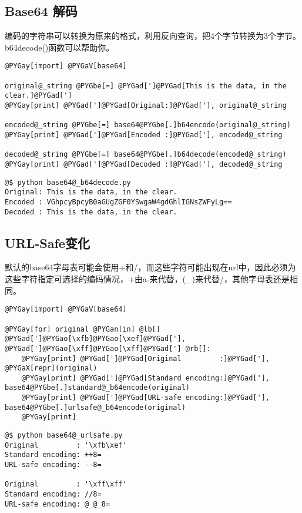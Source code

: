 \documentclass[a4paper,10pt,english]{manual}
\begin{document}
\subsection{Base64 解码}

编码的字符串可以转换为原来的格式，利用反向查询，把4个字节转换为3个字节。b64decode()函数可以帮助你。

\begin{Verbatim}[commandchars=@\[\]]
@PYGay[import] @PYGaV[base64]

original@_string @PYGbe[=] @PYGad[']@PYGad[This is the data, in the clear.]@PYGad[']
@PYGay[print] @PYGad[']@PYGad[Original:]@PYGad['], original@_string

encoded@_string @PYGbe[=] base64@PYGbe[.]b64encode(original@_string)
@PYGay[print] @PYGad[']@PYGad[Encoded :]@PYGad['], encoded@_string

decoded@_string @PYGbe[=] base64@PYGbe[.]b64decode(encoded@_string)
@PYGay[print] @PYGad[']@PYGad[Decoded :]@PYGad['], decoded@_string
\end{Verbatim}

\begin{Verbatim}[commandchars=@\[\]]
@$ python base64@_b64decode.py
Original: This is the data, in the clear.
Encoded : VGhpcyBpcyB0aGUgZGF0YSwgaW4gdGhlIGNsZWFyLg==
Decoded : This is the data, in the clear.
\end{Verbatim}


\subsection{URL-Safe变化}

默认的base64字母表可能会使用+和/，而这些字符可能出现在url中，因此必须为这些字符指定可选择的编码情况，+由a-来代替，(\_)来代替/，其他字母表还是相同。

\begin{Verbatim}[commandchars=@\[\]]
@PYGay[import] @PYGaV[base64]

@PYGay[for] original @PYGan[in] @lb[] @PYGad[']@PYGao[\xfb]@PYGao[\xef]@PYGad['], @PYGad[']@PYGao[\xff]@PYGao[\xff]@PYGad['] @rb[]:
    @PYGay[print] @PYGad[']@PYGad[Original         :]@PYGad['], @PYGaX[repr](original)
    @PYGay[print] @PYGad[']@PYGad[Standard encoding:]@PYGad['], base64@PYGbe[.]standard@_b64encode(original)
    @PYGay[print] @PYGad[']@PYGad[URL-safe encoding:]@PYGad['], base64@PYGbe[.]urlsafe@_b64encode(original)
    @PYGay[print]
\end{Verbatim}

\begin{Verbatim}[commandchars=@\[\]]
@$ python base64@_urlsafe.py
Original         : '\xfb\xef'
Standard encoding: ++8=
URL-safe encoding: --8=

Original         : '\xff\xff'
Standard encoding: //8=
URL-safe encoding: @_@_8=
\end{Verbatim}
\end{document}
